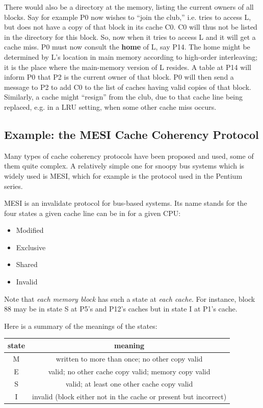 There would also be a directory at the memory, listing the current
owners of all blocks. Say for example P0 now wishes to ``join the
club,'' i.e. tries to access L, but does not have a copy of that block
in its cache C0.  C0 will thus not be listed in the directory for this
block.  So, now when  it tries to access L and it will get a cache miss.
P0 must now consult the {\bf home} of L, say P14.  The home might be
determined by L's location in main memory according to high-order
interleaving; it is the place where the main-memory version of L
resides.  A table at P14 will inform P0 that P2 is the current owner of
that block. P0 will then send a message to P2 to add C0 to the list of
caches having valid copies of that block.  Similarly, a cache might
``resign'' from the club, due to that cache line being replaced, e.g. in
a LRU setting, when some other cache miss occurs.

\subsection{Example: the MESI Cache Coherency Protocol}

Many types of cache coherency protocols have been proposed and used,
some of them quite complex. A relatively simple one for snoopy bus
systems which is widely used is MESI, which for example is the protocol
used in the Pentium series.

MESI is an invalidate protocol for bus-based systems.  Its name stands
for the four states a given cache line can be in for a given CPU:

\begin{itemize}

\item Modified
\item Exclusive
\item Shared
\item Invalid

\end{itemize}

Note that {\it each memory block} has such a state at {\it each cache}.
For instance, block 88 may be in state S at P5's and P12's caches but in
state I at P1's cache.

Here is a summary of the meanings of the states:


\begin{tabular}{|c|c|}
\hline
state&
 meaning\\
\hline
M&
 written to more than once; no other copy valid\\
\hline
E&
 valid; no other cache copy valid; memory copy valid\\
\hline
S&
 valid; at least one other cache copy valid\\
\hline
I&
 invalid (block either not in the cache or present but incorrect) \\
\hline
\end{tabular}

